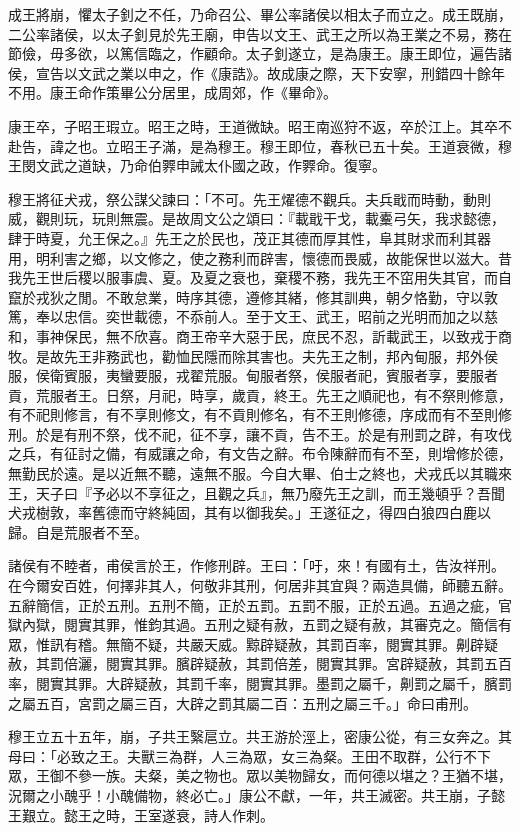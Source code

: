 \begin{pinyinscope}
成王將崩，懼太子釗之不任，乃命召公、畢公率諸侯以相太子而立之。成王既崩，二公率諸侯，以太子釗見於先王廟，申告以文王、武王之所以為王業之不易，務在節儉，毋多欲，以篤信臨之，作顧命。太子釗遂立，是為康王。康王即位，遍告諸侯，宣告以文武之業以申之，作《康誥》。故成康之際，天下安寧，刑錯四十餘年不用。康王命作策畢公分居里，成周郊，作《畢命》。

康王卒，子昭王瑕立。昭王之時，王道微缺。昭王南巡狩不返，卒於江上。其卒不赴告，諱之也。立昭王子滿，是為穆王。穆王即位，春秋已五十矣。王道衰微，穆王閔文武之道缺，乃命伯臩申誡太仆國之政，作臩命。復寧。

穆王將征犬戎，祭公謀父諫曰：「不可。先王燿德不觀兵。夫兵戢而時動，動則威，觀則玩，玩則無震。是故周文公之頌曰：『載戢干戈，載櫜弓矢，我求懿德，肆于時夏，允王保之。』先王之於民也，茂正其德而厚其性，阜其財求而利其器用，明利害之鄉，以文修之，使之務利而辟害，懷德而畏威，故能保世以滋大。昔我先王世后稷以服事虞、夏。及夏之衰也，棄稷不務，我先王不窋用失其官，而自竄於戎狄之閒。不敢怠業，時序其德，遵修其緒，修其訓典，朝夕恪勤，守以敦篤，奉以忠信。奕世載德，不忝前人。至于文王、武王，昭前之光明而加之以慈和，事神保民，無不欣喜。商王帝辛大惡于民，庶民不忍，訢載武王，以致戎于商牧。是故先王非務武也，勸恤民隱而除其害也。夫先王之制，邦內甸服，邦外侯服，侯衛賓服，夷蠻要服，戎翟荒服。甸服者祭，侯服者祀，賓服者享，要服者貢，荒服者王。日祭，月祀，時享，歲貢，終王。先王之順祀也，有不祭則修意，有不祀則修言，有不享則修文，有不貢則修名，有不王則修德，序成而有不至則修刑。於是有刑不祭，伐不祀，征不享，讓不貢，告不王。於是有刑罰之辟，有攻伐之兵，有征討之備，有威讓之命，有文告之辭。布令陳辭而有不至，則增修於德，無勤民於遠。是以近無不聽，遠無不服。今自大畢、伯士之終也，犬戎氏以其職來王，天子曰『予必以不享征之，且觀之兵』，無乃廢先王之訓，而王幾頓乎？吾聞犬戎樹敦，率舊德而守終純固，其有以御我矣。」王遂征之，得四白狼四白鹿以歸。自是荒服者不至。

諸侯有不睦者，甫侯言於王，作修刑辟。王曰：「吁，來！有國有土，告汝祥刑。在今爾安百姓，何擇非其人，何敬非其刑，何居非其宜與？兩造具備，師聽五辭。五辭簡信，正於五刑。五刑不簡，正於五罰。五罰不服，正於五過。五過之疵，官獄內獄，閱實其罪，惟鈞其過。五刑之疑有赦，五罰之疑有赦，其審克之。簡信有眾，惟訊有稽。無簡不疑，共嚴天威。黥辟疑赦，其罰百率，閱實其罪。劓辟疑赦，其罰倍灑，閱實其罪。臏辟疑赦，其罰倍差，閱實其罪。宮辟疑赦，其罰五百率，閱實其罪。大辟疑赦，其罰千率，閱實其罪。墨罰之屬千，劓罰之屬千，臏罰之屬五百，宮罰之屬三百，大辟之罰其屬二百：五刑之屬三千。」命曰甫刑。

穆王立五十五年，崩，子共王繄扈立。共王游於涇上，密康公從，有三女奔之。其母曰：「必致之王。夫獸三為群，人三為眾，女三為粲。王田不取群，公行不下眾，王御不參一族。夫粲，美之物也。眾以美物歸女，而何德以堪之？王猶不堪，況爾之小醜乎！小醜備物，終必亡。」康公不獻，一年，共王滅密。共王崩，子懿王艱立。懿王之時，王室遂衰，詩人作刺。


\end{pinyinscope}
